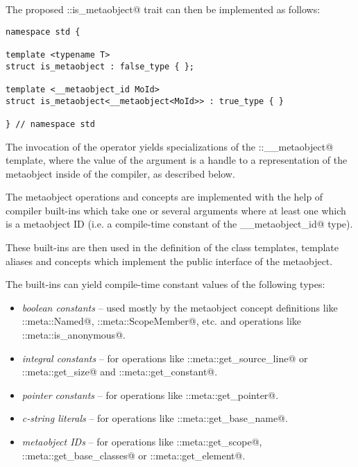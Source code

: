 The proposed \verb@std::is_metaobject@ trait can then be implemented as follows: 

\begin{verbatim}
namespace std {

template <typename T>
struct is_metaobject : false_type { };

template <__metaobject_id MoId>
struct is_metaobject<__metaobject<MoId>> : true_type { }

} // namespace std
\end{verbatim}

The invocation of the \verb@reflexpr@ operator yields specializations of
the \verb@std::__metaobject@ template, where the value of the \verb@MoId@
argument is a handle to a representation of the metaobject inside of
the compiler, as described below. 


The metaobject operations and concepts are implemented with the help of compiler
built-ins which take one or several arguments where at least one which is
a metaobject ID (i.e. a compile-time constant of the \verb@__metaobject_id@ type).

These built-ins are then used in the definition of the class templates,
template aliases and concepts which implement the public interface of
the metaobject.

The built-ins can yield compile-time constant values of the following types: 


\begin{itemize}
\item{{\em boolean constants} -- used mostly by the metaobject concept definitions
like \verb@std::meta::Named@, \verb@std::meta::ScopeMember@, etc. and operations
like \verb@std::meta::is_anonymous@.}

\item{{\em integral constants} -- for operations like \verb@std::meta::get_source_line@
or \verb@std::meta::get_size@ and \verb@std::meta::get_constant@.}

\item{{\em pointer constants} -- for operations like \verb@std::meta::get_pointer@.}

\item{{\em c-string literals} -- for operations like \verb@std::meta::get_base_name@.}

\item{{\em metaobject IDs} -- for operations like \verb@std::meta::get_scope@,
\verb@std::meta::get_base_classes@ or \verb@std::meta::get_element@.}
\end{itemize}


